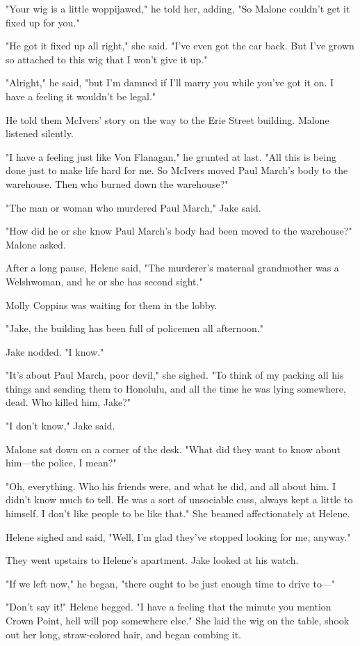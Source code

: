 \documentclass{novel}
\begin{document}
"Your wig is a little woppijawed," he told her, adding, "So Malone couldn't get it fixed up for you."

"He got it fixed up all right," she said. "I've even got the car back. But I've grown so attached to this wig that I won't give it up."

"Alright," he said, "but I'm damned if I'll marry you while you've got it on. I have a feeling it wouldn't be legal."

He told them McIvers' story on the way to the Erie Street building. Malone listened silently.

"I have a feeling just like Von Flanagan," he grunted at last. "All this is being done just to make life hard for me. So McIvers moved Paul March's body to the warehouse. Then who burned down the warehouse?"

"The man or woman who murdered Paul March," Jake said.

"How did he or she know Paul March's body had been moved to the warehouse?" Malone asked.

After a long pause, Helene said, "The murderer's maternal grandmother was a Welshwoman, and he or she has second sight."

Molly Coppins was waiting for them in the lobby.

"Jake, the building has been full of policemen all afternoon."

Jake nodded. "I know."

"It's about Paul March, poor devil," she sighed. "To think of my packing all his things and sending them to Honolulu, and all the time he was lying somewhere, dead. Who killed him, Jake?"

"I don't know," Jake said.

Malone sat down on a corner of the desk. "What did they want to know about him—the police, I mean?"

"Oh, everything. Who his friends were, and what he did, and all about him. I didn't know much to tell. He was a sort of unsociable cuss, always kept a little to himself. I don't like people to be like that." She beamed affectionately at Helene.

Helene sighed and said, "Well, I'm glad they've stopped looking for me, anyway."

They went upstairs to Helene's apartment. Jake looked at his watch.

"If we left now," he began, "there ought to be just enough time to drive to—"

"Don't say it!" Helene begged. "I have a feeling that the minute you mention Crown Point, hell will pop somewhere else." She laid the wig on the table, shook out her long, straw-colored hair, and began combing it.
\end{document}
